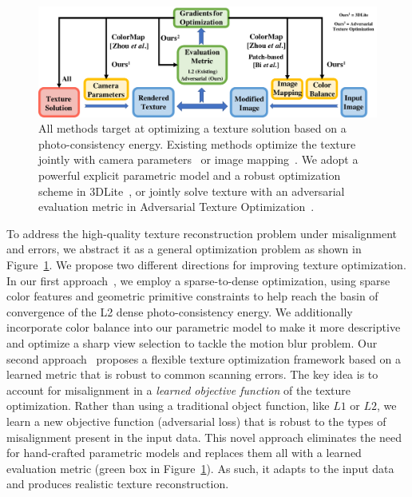 \begin{figure}
    \centering
    \includegraphics[width=\linewidth]{texturegen/figures/concept.pdf}
    \caption{All methods target at optimizing a texture solution based on a photo-consistency energy. Existing methods optimize the texture jointly with camera parameters~\cite{zhou2014color} or image mapping~\cite{zhou2014color,bi2017patch}. We adopt a powerful explicit parametric model and a robust optimization scheme in 3DLite~\cite{huang20173dlite}, or jointly solve texture with an adversarial evaluation metric in Adversarial Texture Optimization~\cite{huang2020adversarial}.}
    \label{fig:toptim-concept}
\end{figure}

To address the high-quality texture reconstruction problem under misalignment and errors, we abstract it as a general optimization problem as shown in Figure~\ref{fig:toptim-concept}.
%
We propose two different directions for improving texture optimization. In our first approach~\cite{huang20173dlite}, we employ a sparse-to-dense optimization, using sparse color features and geometric primitive constraints to help reach the basin of convergence of the L2 dense photo-consistency energy. We additionally incorporate color balance into our parametric model to make it more descriptive and optimize a sharp view selection to tackle the motion blur problem. Our second approach~\cite{huang2020adversarial} proposes a flexible texture optimization framework based on a learned metric that is robust to common scanning errors.
The key idea is to account for misalignment in a {\em learned objective function} of the texture optimization.   
Rather than using a traditional object function, like $L1$ or $L2$, we learn a new objective function (adversarial loss) that is robust to the types of misalignment present in the input data.  This novel approach eliminates the need for hand-crafted parametric models and replaces them all with a learned evaluation metric (green box in Figure~\ref{fig:toptim-concept}).  As such, it adapts to the input data and produces realistic texture reconstruction.

